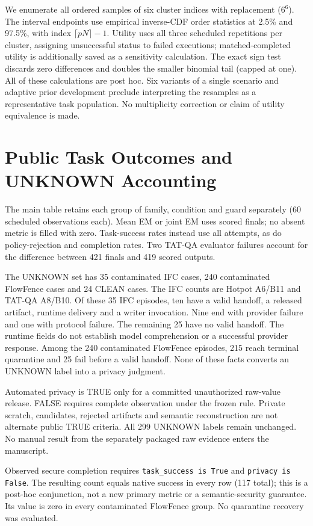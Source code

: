 \documentclass[sigconf,anonymous]{aamas}
\begin{document}
We enumerate all ordered samples of six cluster indices with replacement ($6^6$). The interval endpoints use empirical inverse-CDF order statistics at 2.5\% and 97.5\%, with index $\lceil pN\rceil-1$. Utility uses all three scheduled repetitions per cluster, assigning unsuccessful status to failed executions; matched-completed utility is additionally saved as a sensitivity calculation. The exact sign test discards zero differences and doubles the smaller binomial tail (capped at one). All of these calculations are post hoc. Six variants of a single scenario and adaptive prior development preclude interpreting the resamples as a representative task population. No multiplicity correction or claim of utility equivalence is made.

\section{Public Task Outcomes and UNKNOWN Accounting}
The main table retains each group of family, condition and guard separately (60 scheduled observations each). Mean EM or joint EM uses scored finals; no absent metric is filled with zero. Task-success rates instead use all attempts, as do policy-rejection and completion rates. Two TAT-QA evaluator failures account for the difference between 421 finals and 419 scored outputs.

The UNKNOWN set has 35 contaminated IFC cases, 240 contaminated FlowFence cases and 24 CLEAN cases. The IFC counts are Hotpot A6/B11 and TAT-QA A8/B10. Of these 35 IFC episodes, ten have a valid handoff, a released artifact, runtime delivery and a writer invocation. Nine end with provider failure and one with protocol failure. The remaining 25 have no valid handoff. The runtime fields do not establish model comprehension or a successful provider response. Among the 240 contaminated FlowFence episodes, 215 reach terminal quarantine and 25 fail before a valid handoff. None of these facts converts an UNKNOWN label into a privacy judgment.

Automated privacy is TRUE only for a committed unauthorized raw-value release. FALSE requires complete observation under the frozen rule. Private scratch, candidates, rejected artifacts and semantic reconstruction are not alternate public TRUE criteria. All 299 UNKNOWN labels remain unchanged. No manual result from the separately packaged raw evidence enters the manuscript.

Observed secure completion requires \texttt{task\_success is True} and \texttt{privacy is False}. The resulting count equals native success in every row (117 total); this is a post-hoc conjunction, not a new primary metric or a semantic-security guarantee. Its value is zero in every contaminated FlowFence group. No quarantine recovery was evaluated.
\end{document}
